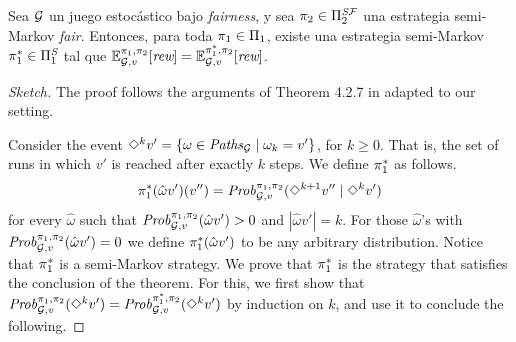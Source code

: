 \begin{lemma}\label{lm:semimarkov2}
  Sea $\mathcal{G}$ un juego estocástico bajo \textit{fairness},  y sea
  $\pi_{2} \in \Pi^{\textit{S}\mathcal{F}}_{2}$ una estrategia semi-Markov
  \textit{fair}. Entonces, para toda $\pi_{1} \in \Pi_{1}$, existe una estrategia
  semi-Markov $\pi^*_{1} \in \Pi^{\textit{S}}_{1}$
  tal que
  $\mathbb{E}^{\pi_{1}, \pi_{2}}_{\mathcal{G}, v}[\textit{rew}] =
  \mathbb{E}^{\pi^*_{1}, \pi_{2}}_{\mathcal{G}, v}[\textit{rew}]$.
\end{lemma}
%
\iffalse
\begin{proof}[Sketch]
  The proof follows the arguments of Theorem 4.2.7 in \cite{FilarV96}
  adapted to our setting.
	
  Consider the event $\Diamond^{k} v' = \{ \omega \in
  \mathit{Paths}_{\mathcal{G}} \mid \omega_k = v'\}$, for $k\geq 0$. That is,
  the set of runs in which $v'$ is reached after exactly $k$ steps.
  We define $\pi^*_{1}$ as follows.
  \[
  \pi^*_{1}(\hat{\omega}v')(v'') =  \mathit{Prob}^{\pi_{1}, \pi_{2}}_{\mathcal{G},v}(\Diamond^{k+1} v'' \mid \Diamond^k v') 
  \]
  for every $\hat{\omega}$ such that $\mathit{Prob}^{\pi_{1}, \pi_{2}}_{\mathcal{G},v}(\hat{\omega}v') > 0$ and $|\hat{\omega}v'| = k$.  For those $\hat{\omega}$'s with $\mathit{Prob}^{\pi_{1}, \pi_{2}}_{\mathcal{G},v}(\hat{\omega}v') = 0$ we define $\pi^*_{1}(\hat{\omega}v')$ to be any arbitrary distribution.
  Notice that $\pi^*_{1}$ is a semi-Markov strategy.
  We prove that $\pi^*_{1}$ is the strategy that satisfies the
  conclusion of the theorem.
  For this, we first show that $\mathit{Prob}^{\pi_{1}, \pi_{2}}_{\mathcal{G},v}(\Diamond^{k} v') = \mathit{Prob}^{\pi^*_{1}, \pi_{2}}_{\mathcal{G},v}(\Diamond^{k} v')$ by induction on $k$, and use it to conclude the following. 

\end{proof}
